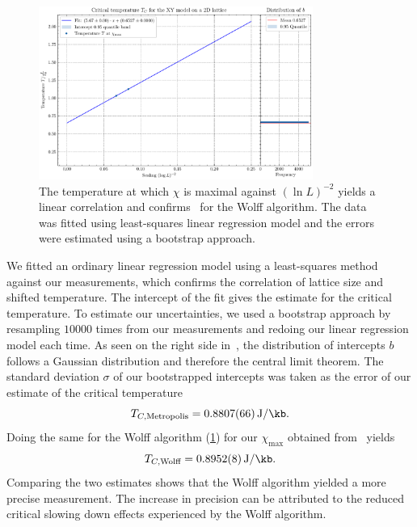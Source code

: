 		\begin{figure}[htbp]
			\centering
			\includegraphics[width=0.8\textwidth]{../figures/Wolff/Critical_Temperature.pdf}
						\caption[Estimating $T_C$ using the Wolff algorithm by plotting $T$ where $\chi$ is maximal against $(\ln L)^{-2}$]{The temperature at which $\chi$ is maximal against $(\ln L)^{-2}$ yields a linear correlation and confirms~ for the Wolff algorithm. The data was fitted using least-squares linear regression model and the errors were estimated using a bootstrap approach.}
			\label{fig:critical_temperature_wolf}
		\end{figure}
		
		We fitted an ordinary linear regression model using a least-squares method against our measurements, which confirms the correlation of lattice size and shifted temperature. The intercept of the fit gives the estimate for the critical temperature. To estimate our uncertainties, we used a bootstrap approach by resampling $\num{10 000}$ times from our measurements and redoing our linear regression model each time. As seen on the right side in~, the distribution of intercepts $b$ follows a Gaussian distribution and therefore the central limit theorem. The standard deviation $\sigma$ of our bootstrapped intercepts was taken as the error of our estimate of the critical temperature
		\begin{equation}
			T_{C, \text{Metropolis}} = \SI{0.8807(66)}{\J\per\kb}.
		\end{equation}
		Doing the same for the Wolff algorithm (\cref{fig:critical_temperature_wolf}) for our $\chi_\text{max}$ obtained from~ yields
		\begin{equation}
			T_{C, \text{Wolff}} = \SI{0.8952(8)}{\J\per\kb}.
		\end{equation}
		Comparing the two estimates shows that the Wolff algorithm yielded a more precise measurement. The increase in precision can be attributed to the reduced critical slowing down effects experienced by the Wolff algorithm.
		
